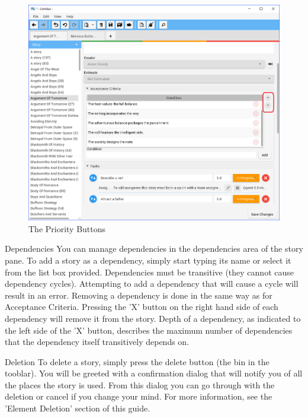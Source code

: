 \begin{figure}[H]
\centering
\includegraphics[width=\textwidth]{images/screenshots/AcceptanceCriteria3.PNG}
\caption{The Priority Buttons}
\label{fig:new_project}
\end{figure}

Dependencies\newline
You can manage dependencies in the dependencies area of the story pane. To add a story as a dependency, simply start typing its name or select it from the list box provided. Dependencies must be transitive (they cannot cause dependency cycles). Attempting to add a dependency that will cause a cycle will result in an error.\newline
Removing a dependency is done in the same way as for Acceptance Criteria. Pressing the 'X' button on the right hand side of each dependency will remove it from the story.\newline
Depth of a dependency, as indicated to the left side of the 'X' button, describes the maximum number of dependencies that the dependency itself transitively depends on.\newline\newline

Deletion\newline
To delete a story, simply press the delete button (the bin in the tooblar). You will be greeted with a confirmation dialog that will notify you of all the places the story is used. From this dialog you can go through with the deletion or cancel if you change your mind. For more information, see the 'Element Deletion' section of this guide.

